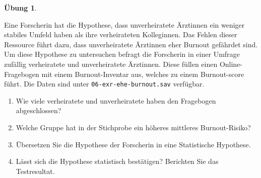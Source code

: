 \documentclass[
]{book}
\providecommand{\tightlist}{%
  \setlength{\itemsep}{0pt}\setlength{\parskip}{0pt}}
\theoremstyle{definition}
\theoremstyle{definition}
\theoremstyle{definition}
\newtheorem{exercise}{Übung}[chapter]
\theoremstyle{definition}
\theoremstyle{remark}
\begin{document}
\begin{exercise}
\protect\hypertarget{exr:ehe-burnout}{}\label{exr:ehe-burnout}\leavevmode

Eine Forscherin hat die Hypothese, dass unverheiratete Ärztinnen ein weniger stabiles Umfeld haben als ihre verheirateten Kolleginnen. Das Fehlen dieser Ressource führt dazu, dass unverheiratete Ärztinnen eher Burnout gefährdet sind. Um diese Hypothese zu untersuchen befragt die Forscherin in einer Umfrage zufällig verheiratete und unverheiratete Ärztinnen. Diese füllen einen Online-Fragebogen mit einem Burnout-Inventar aus, welches zu einem Burnout-score führt. Die Daten sind unter \texttt{06-exr-ehe-burnout.sav} verfügbar.

\begin{enumerate}
\def\labelenumi{\alph{enumi})}
\tightlist
\item
  Wie viele verheiratete und unverheiratete haben den Fragebogen abgeschlossen?
\item
  Welche Gruppe hat in der Stichprobe ein höheres mittleres Burnout-Risiko?
\item
  Übersetzen Sie die Hypothese der Forscherin in eine Statistische Hypothese.
\item
  Lässt sich die Hypothese statistisch bestätigen? Berichten Sie das Testresultat.
\end{enumerate}

\end{exercise}
\end{document}
